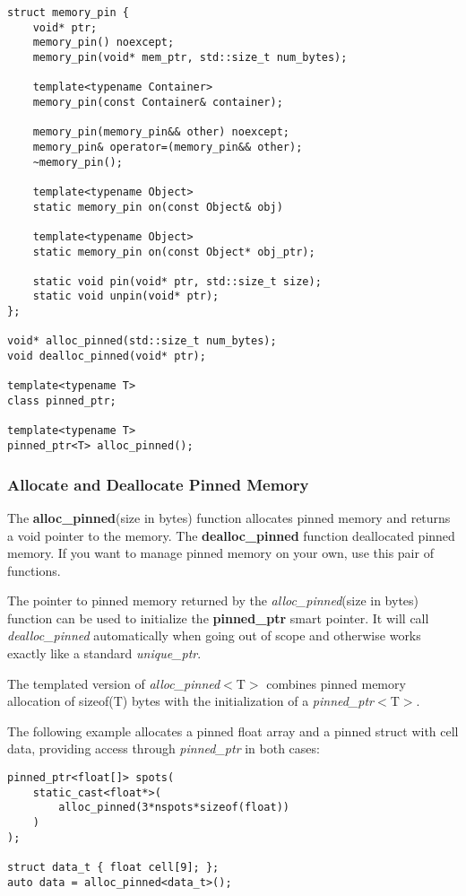 \documentclass[a4paper,10pt]{article}
\begin{document}
\begin{lstlisting}
struct memory_pin {
    void* ptr;
    memory_pin() noexcept;
    memory_pin(void* mem_ptr, std::size_t num_bytes);

    template<typename Container>
    memory_pin(const Container& container);

    memory_pin(memory_pin&& other) noexcept;
    memory_pin& operator=(memory_pin&& other);
    ~memory_pin();

    template<typename Object>
    static memory_pin on(const Object& obj)

    template<typename Object>
    static memory_pin on(const Object* obj_ptr);

    static void pin(void* ptr, std::size_t size);
    static void unpin(void* ptr);
};

void* alloc_pinned(std::size_t num_bytes);
void dealloc_pinned(void* ptr);

template<typename T>
class pinned_ptr;

template<typename T>
pinned_ptr<T> alloc_pinned();
\end{lstlisting}

\subsubsection{Allocate and Deallocate Pinned Memory}

The \textbf{alloc\_pinned}(size in bytes) function allocates pinned memory and returns a void pointer to the memory. The \textbf{dealloc\_pinned} function deallocated pinned memory. If you want to manage pinned memory on your own, use this pair of functions.

The pointer to pinned memory returned by the \emph{alloc\_pinned}(size in bytes) function can be used to initialize the \textbf{pinned\_ptr} smart pointer. It will call \emph{dealloc\_pinned} automatically when going out of scope and otherwise works exactly like a standard \emph{unique\_ptr}.

The templated version of \emph{alloc\_pinned}$<$T$>$ combines pinned memory allocation of sizeof(T) bytes with the initialization of a \emph{pinned\_ptr}$<$T$>$.

The following example allocates a pinned float array and a pinned struct with cell data, providing access through \emph{pinned\_ptr} in both cases:

\begin{lstlisting}
pinned_ptr<float[]> spots(
    static_cast<float*>(
        alloc_pinned(3*nspots*sizeof(float))
    )
);

struct data_t { float cell[9]; };
auto data = alloc_pinned<data_t>();
\end{lstlisting}
\end{document}
